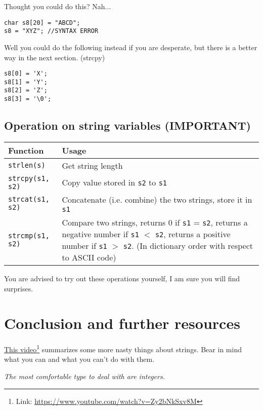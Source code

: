 Thought you could do this? Nah...

\begin{lstlisting}
char s8[20] = "ABCD";
s8 = "XYZ"; //SYNTAX ERROR
\end{lstlisting}

Well you could do the following instead if you are desperate, but there is a better way in the next section. (strcpy)

\begin{lstlisting}
s8[0] = 'X'; 
s8[1] = 'Y'; 
s8[2] = 'Z'; 
s8[3] = '\0'; 
\end{lstlisting}


\subsection{Operation on string variables (IMPORTANT)}

\begin{table}[h]
    \centering
    \begin{tabular}{|m{10em}|m{25em}|}
        \hline
        \textbf{Function} & 
        Usage 
        \\ \hline \hline
        
        \texttt{strlen(s)} &
        Get string length
        \\ \hline
        
        \texttt{strcpy(s1, s2)} &
        Copy value stored in \texttt{s2} to \texttt{s1} 
        \\ \hline
        
        \texttt{strcat(s1, s2)} &
        Concatenate (i.e. combine) the two strings, store it in \texttt{s1} 
        \\ \hline
        
        \texttt{strcmp(s1, s2)} &
        Compare two strings, returns 0 if \texttt{s1} = \texttt{s2}, returns a negative number if \texttt{s1} $<$ \texttt{s2}, returns a positive number if \texttt{s1} $>$ \texttt{s2}. (In dictionary order with respect to ASCII code)
        \\ \hline
    \end{tabular}
\end{table}

You are advised to try out these operations yourself, I am sure you will find surprises.

\section{Conclusion and further resources}

\href{https://www.youtube.com/watch?v=Zy2bNkSxv8M}{This video}\footnote{Link: \href{https://www.youtube.com/watch?v=Zy2bNkSxv8M}{https://www.youtube.com/watch?v=Zy2bNkSxv8M}} summarizes some more nasty things about strings. Bear in mind what you can and what you can't do with them.
\vspace{6mm}

\begin{center}
\textit{The most comfortable type to deal with are integers.}
\end{center}
